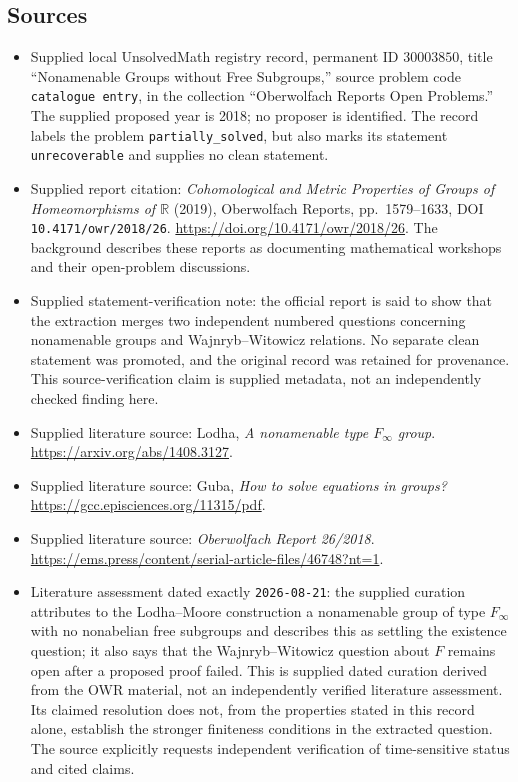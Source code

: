 \documentclass[11pt]{article}
\newcommand{\R}{\mathbb{R}}
\begin{document}
\subsection{Sources}
\begin{itemize}
\item Supplied local UnsolvedMath registry record, permanent ID \(30003850\), title ``Nonamenable Groups without Free Subgroups,'' source problem code \texttt{catalogue entry}, in the collection ``Oberwolfach Reports Open Problems.'' The supplied proposed year is 2018; no proposer is identified. The record labels the problem \texttt{partially\_solved}, but also marks its statement \texttt{unrecoverable} and supplies no clean statement.
\item Supplied report citation: \emph{Cohomological and Metric Properties of Groups of Homeomorphisms of \(\R\)} (2019), Oberwolfach Reports, pp.\ 1579--1633, DOI \texttt{10.4171/owr/2018/26}. \url{https://doi.org/10.4171/owr/2018/26}. The background describes these reports as documenting mathematical workshops and their open-problem discussions.
\item Supplied statement-verification note: the official report is said to show that the extraction merges two independent numbered questions concerning nonamenable groups and Wajnryb--Witowicz relations. No separate clean statement was promoted, and the original record was retained for provenance. This source-verification claim is supplied metadata, not an independently checked finding here.
\item Supplied literature source: Lodha, \emph{A nonamenable type \(F_\infty\) group}. \url{https://arxiv.org/abs/1408.3127}.
\item Supplied literature source: Guba, \emph{How to solve equations in groups?} \url{https://gcc.episciences.org/11315/pdf}.
\item Supplied literature source: \emph{Oberwolfach Report 26/2018}. \url{https://ems.press/content/serial-article-files/46748?nt=1}.
\item Literature assessment dated exactly \texttt{2026-08-21}: the supplied curation attributes to the Lodha--Moore construction a nonamenable group of type \(F_\infty\) with no nonabelian free subgroups and describes this as settling the existence question; it also says that the Wajnryb--Witowicz question about \(F\) remains open after a proposed proof failed. This is supplied dated curation derived from the OWR material, not an independently verified literature assessment. Its claimed resolution does not, from the properties stated in this record alone, establish the stronger finiteness conditions in the extracted question. The source explicitly requests independent verification of time-sensitive status and cited claims.
\end{itemize}
\end{document}
